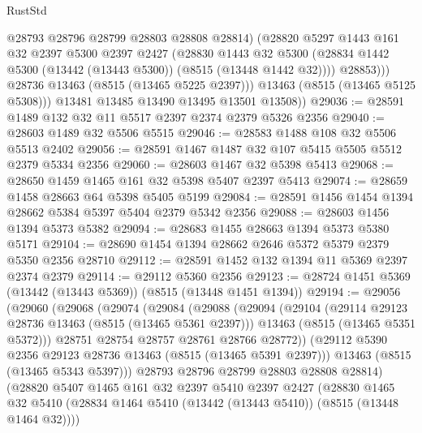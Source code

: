 \begin{lexlean}{RustStd}
\begin{coremodule}
                  @28793
                  @28796
                  @28799
                  @28803
                  @28808
                  @28814)
                (@28820
                  @5297
                  @1443
                  @161
                  @32
                  @2397
                  @5300
                  @2397
                  @2427
                  (@28830
                    @1443
                    @32
                    @5300
                    (@28834 @1442 @5300 (@13442 (@13443 @5300)) (@8515 (@13448 @1442 @32))))
                  @28853)))
            @28736
            @13463
            (@8515 (@13465 @5225 @2397)))
          @13463
          (@8515 (@13465 @5125 @5308)))
        @13481
        @13485
        @13490
        @13495
        @13501
        @13508))
@29036 := @28591 @1489 @132 @32 @11 @5517 @2397 @2374 @2379 @5326 @2356
@29040 := @28603 @1489 @32 @5506 @5515
@29046 := @28583 @1488 @108 @32 @5506 @5513 @2402
@29056 := @28591 @1467 @1487 @32 @107 @5415 @5505 @5512 @2379 @5334 @2356
@29060 := @28603 @1467 @32 @5398 @5413
@29068 := @28650 @1459 @1465 @161 @32 @5398 @5407 @2397 @5413
@29074 := @28659 @1458 @28663 @64 @5398 @5405 @5199
@29084 := @28591 @1456 @1454 @1394 @28662 @5384 @5397 @5404 @2379 @5342 @2356
@29088 := @28603 @1456 @1394 @5373 @5382
@29094 := @28683 @1455 @28663 @1394 @5373 @5380 @5171
@29104 := @28690 @1454 @1394 @28662 @2646 @5372 @5379 @2379 @5350 @2356 @28710
@29112 := @28591 @1452 @132 @1394 @11 @5369 @2397 @2374 @2379
@29114 := @29112 @5360 @2356
@29123 := @28724 @1451 @5369 (@13442 (@13443 @5369)) (@8515 (@13448 @1451 @1394))
@29194 := @29056
    (@29060
      (@29068
        (@29074
          (@29084
            (@29088
              (@29094
                (@29104
                  (@29114 @29123 @28736 @13463 (@8515 (@13465 @5361 @2397)))
                  @13463
                  (@8515 (@13465 @5351 @5372)))
                @28751
                @28754
                @28757
                @28761
                @28766
                @28772))
            (@29112 @5390 @2356 @29123 @28736 @13463 (@8515 (@13465 @5391 @2397)))
            @13463
            (@8515 (@13465 @5343 @5397)))
          @28793
          @28796
          @28799
          @28803
          @28808
          @28814)
        (@28820
          @5407
          @1465
          @161
          @32
          @2397
          @5410
          @2397
          @2427
          (@28830
            @1465
            @32
            @5410
            (@28834 @1464 @5410 (@13442 (@13443 @5410)) (@8515 (@13448 @1464 @32))))

\end{coremodule}
\end{lexlean}
